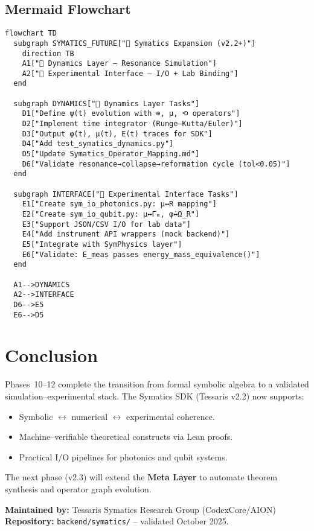 \documentclass[12pt]{article}
\begin{document}
\subsection*{Mermaid Flowchart}
\begin{verbatim}
flowchart TD
  subgraph SYMATICS_FUTURE["🚀 Symatics Expansion (v2.2+)"]
    direction TB
    A1["🌊 Dynamics Layer — Resonance Simulation"]
    A2["🧪 Experimental Interface — I/O + Lab Binding"]
  end

  subgraph DYNAMICS["🌊 Dynamics Layer Tasks"]
    D1["Define ψ(t) evolution with ⊕, μ, ⟲ operators"]
    D2["Implement time integrator (Runge–Kutta/Euler)"]
    D3["Output φ̇(t), μ(t), E(t) traces for SDK"]
    D4["Add test_symatics_dynamics.py"]
    D5["Update Symatics_Operator_Mapping.md"]
    D6["Validate resonance→collapse→reformation cycle (tol<0.05)"]
  end

  subgraph INTERFACE["🧪 Experimental Interface Tasks"]
    E1["Create sym_io_photonics.py: μ↔R mapping"]
    E2["Create sym_io_qubit.py: μ↔Γₘ, φ̇↔Ω_R"]
    E3["Support JSON/CSV I/O for lab data"]
    E4["Add instrument API wrappers (mock backend)"]
    E5["Integrate with SymPhysics layer"]
    E6["Validate: E_meas passes energy_mass_equivalence()"]
  end

  A1-->DYNAMICS
  A2-->INTERFACE
  D6-->E5
  E6-->D5
\end{verbatim}

\section*{Conclusion}
Phases~10--12 complete the transition from formal symbolic algebra to a validated simulation--experimental stack.
The Symatics SDK (Tessaris v2.2) now supports:
\begin{itemize}[noitemsep]
  \item Symbolic $\leftrightarrow$ numerical $\leftrightarrow$ experimental coherence.
  \item Machine--verifiable theoretical constructs via Lean proofs.
  \item Practical I/O pipelines for photonics and qubit systems.
\end{itemize}

The next phase (v2.3) will extend the \textbf{Meta Layer} to automate theorem synthesis and operator graph evolution.

\bigskip
\noindent\textbf{Maintained by:} Tessaris Symatics Research Group (CodexCore/AION)\\
\textbf{Repository:} \texttt{backend/symatics/} -- validated October 2025.
\end{document}
